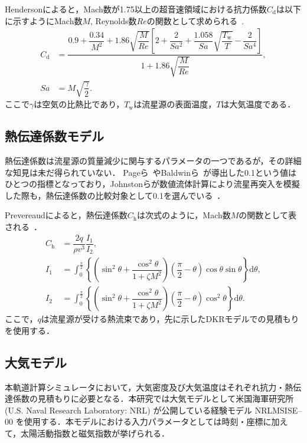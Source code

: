 Hendersonによると，Mach数が1.75以上の超音速領域における抗力係数$C_\mathrm{d}$は以下に示すようにMach数$M$, Reynolds数$Re$の関数として求められる~\cite{henderson1976drag}.
\begin{align}
    \label{eq:drag-coeff}
    C_\mathrm{d} &= \dfrac{0.9 + \dfrac{0.34}{M^2} + 1.86\sqrt{\dfrac{M}{Re}}\left[ 2 + \dfrac{2}{Sa^2} + \dfrac{1.058}{Sa}\sqrt{\dfrac{T_\mathrm{w}}{T}} - \dfrac{2}{Sa^4} \right]}{1 + 1.86\sqrt{\dfrac{M}{Re}}}, \\
    Sa &= M\sqrt{\dfrac{\gamma}{2}}.
\end{align}
ここで$\gamma$は空気の比熱比であり，$T_\mathrm{w}$は流星源の表面温度，$T$は大気温度である．

\subsection{熱伝達係数モデル}
熱伝達係数は流星源の質量減少に関与するパラメータの一つであるが，その詳細な知見は未だ得られていない．
Pageら~\cite{page1969radiative}やBaldwinら~\cite{baldwin1971ablation}が導出した0.1という値はひとつの指標となっており，Johnstonらが数値流体計算により流星再突入を模擬した際も，熱伝達係数の比較対象として0.1を選んでいる~\cite{johnston2018radiative}．

Prevereaudによると，熱伝達係数$C_\mathrm{h}$は次式のように，Mach数$M$の関数として表される~\cite{prevereaud2016phd}．
\begin{align}
    \label{eq:heat-coeff}
    C_\mathrm{h} &= \dfrac{2q}{\rho v^3}\dfrac{I_1}{I_2},\\
    I_1 &= \int_0^{\frac{\pi}{2}}\left\{\left( \sin^2\theta + \dfrac{\cos^2\theta}{1+\zeta M^2} \right)\left(\dfrac{\pi}{2} - \theta\right)\cos\theta\sin\theta\right\}\mathrm{d}\theta,\\
    I_2 &= \int_0^{\frac{\pi}{2}}\left\{\left( \sin^2\theta + \dfrac{\cos^2\theta}{1+\zeta M^2} \right)\left(\dfrac{\pi}{2} - \theta\right)\cos^2\theta\right\}\mathrm{d}\theta.
\end{align}
ここで，$q$は流星源が受ける熱流束であり，先に示したDKRモデルでの見積もりを使用する．

\subsection{大気モデル}
本軌道計算シミュレータにおいて，大気密度及び大気温度はそれぞれ抗力・熱伝達係数の見積もりに必要となる．本研究では大気モデルとして米国海軍研究所 (U.S. Naval Research Laboratory: NRL) が公開している経験モデル NRLMSISE–00 を使用する．本モデルにおける入力パラメータとしては時刻・座標に加えて，太陽活動指数と磁気指数が挙げられる．

